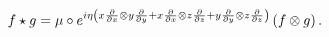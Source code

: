 \begin{equation}
f\star g=\mu \circ e^{i\eta \left( x\frac{\partial }{\partial x}\otimes y%
\frac{\partial }{\partial y}+x\frac{\partial }{\partial x}\otimes z\frac{%
\partial }{\partial z}+y\frac{\partial }{\partial y}\otimes z\frac{\partial 
}{\partial z}\right) }\left( f\otimes g\right) .
\end{equation}

